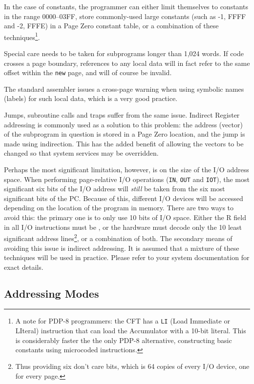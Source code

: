 \documentclass[11pt,a4paper,twocolumns]{article}
\newcommand\hex[1]{\textsf{#1}}
\newcommand\register[1]{\textsf{#1}}
\newcommand\PC{\register{PC}}
\begin{document}
In the case of constants, the programmer can either limit themselves
to constants in the range \hex{0000}–\hex{03FF}, store commonly-used
large constants (such as -1, \hex{FFFF} and -2, \hex{FFFE}) in a Page
Zero constant table, or a combination of these techniques\footnote{A
  note for PDP-8 programmers: the CFT has a {\tt LI} (Load Immediate
  or LIteral) instruction that can load the Accumulator with a 10-bit
  literal. This is considerably faster the the only PDP-8 alternative,
  constructing basic constants using microcoded instructions.}.

Special care needs to be taken for subprograms longer than 1,024
words. If code crosses a page boundary, references to any local data
will in fact refer to the same offset within the {\tt new\/} page, and
will of course be invalid.

The standard assembler issues a cross-page warning when using symbolic
names (labels) for such local data, which is a very good practice.

Jumps, subroutine calls and traps suffer from the same issue. Indirect
Register addressing is commonly used as a solution to this problem:
the address (vector) of the subprogram in question is stored in a Page
Zero location, and the jump is made using indirection. This has the
added benefit of allowing the vectors to be changed so that system
services may be overridden.

Perhaps the most significant limitation, however, is on the size of
the I/O address space. When performing page-relative I/O operations
({\tt IN}, {\tt OUT} and {\tt IOT}), the most significant six bits of
the I/O address will {\em still\/} be taken from the six most
significant bits of the \PC. Because of this, different I/O devices
will be accessed depending on the location of the program in
memory. There are two ways to avoid this: the primary one is to only
use 10 bits of I/O space. Either the R field in all I/O instructions
must be {}, or the hardware must decode only the 10 least significant
address lines\footnote{Thus providing six don't care bits, which is 64
  copies of every I/O device, one for every page.}, or a combination
of both. The secondary means of avoiding this issue is indirect
addressing. It is assumed that a mixture of these techniques will be
used in practice. Please refer to your system documentation for exact
details.

\subsection{Addressing Modes}
\end{document}
